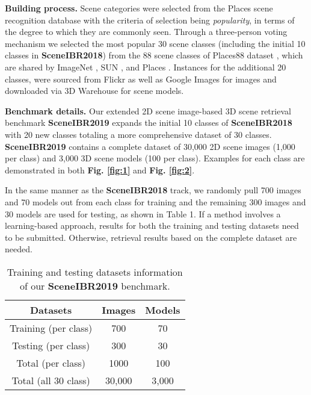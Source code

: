 \documentclass[../main.tex]{subfiles}
\begin{document}
\textbf{Building process.} 
Scene categories were selected from the Places scene 
recognition database \cite{zhou2017places} with the 
criteria of selection being \textit{popularity}, in terms 
of the degree to which they are commonly seen. Through a 
three-person voting mechanism we selected the most 
popular 30 scene classes (including the initial 10 
classes in \textbf{SceneIBR2018}) from the 88 scene 
classes of Places88 dataset \cite{Places88}, which are 
shared by ImageNet \cite{ImageNet}, SUN \cite{SUN}, and 
Places \cite{zhou2017places}. 
Instances for the additional 20 classes, were sourced from Flickr \cite{Flickr} as well as Google Images\cite{GoogleImages} for images and downloaded via 3D Warehouse \cite{3DWarehouse} for scene models. 

\textbf{Benchmark details.} Our extended 2D scene image-based 3D scene retrieval benchmark \textbf{SceneIBR2019} expands the initial 10 classes of \textbf{SceneIBR2018} with 20 new classes totaling a more comprehensive dataset of 30 classes. \textbf{SceneIBR2019} contains a complete dataset of 30,000 2D scene images (1,000 per class) and 3,000 3D scene models (100 per class). Examples for each class are demonstrated in both \textbf{Fig. \ref{fig:1}} and \textbf{Fig. \ref{fig:2}}.

In the same manner as the \textbf{SceneIBR2018} track, we randomly pull 700 images and 70 models out from each class for training and the remaining 300 images and 30 models are used for testing, as shown in Table 1. If a method involves a learning-based approach, results for both the training and testing datasets need to be submitted. Otherwise, retrieval results based on the complete dataset are needed.


\begin{table}[h]
	\centering
	\caption{Training and testing datasets information of our \textbf{SceneIBR2019} benchmark.}
	\begin{center}
		\begin{tabular}  {|c|c|c|}
			\hline
			\textbf{\normalsize{Datasets}} & \textbf{\normalsize{Images}} & \textbf{\normalsize{Models}}\\
			\hline
			\normalsize{Training (per class)}  & 700  & 70  \\
			\hline
			\normalsize{Testing (per class)}  & 300  & 30  \\
			\hline
			\normalsize{Total (per class)}  & 1000  & 100  \\
			\hline
			\normalsize{Total (all 30 class)}  & 30,000  & 3,000  \\
			\hline
		\end{tabular}
	\end{center}
	\label{table1}
\end{table}
\end{document}
